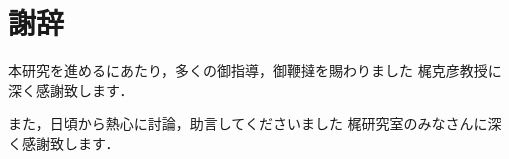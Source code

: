 \chapter*{謝辞}

本研究を進めるにあたり，多くの御指導，御鞭撻を賜わりました
梶克彦教授に深く感謝致します．

また，日頃から熱心に討論，助言してくださいました
梶研究室のみなさんに深く感謝致します．

